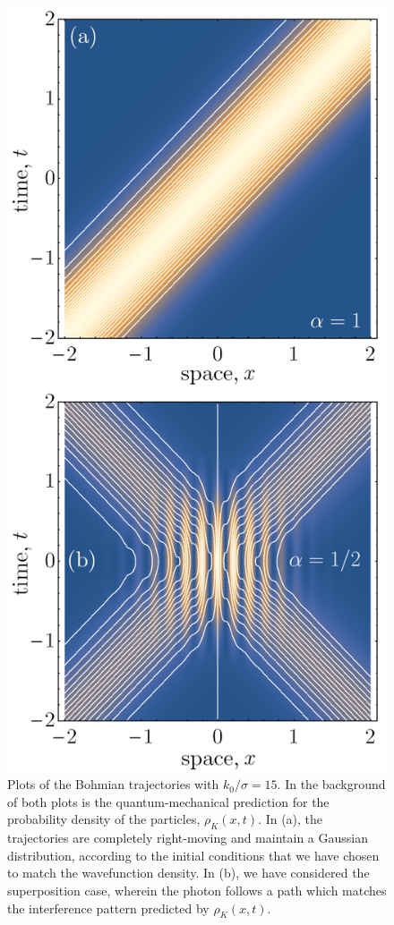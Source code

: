 \documentclass[
prx
,twocolumn
,nofootinbib
,floatfix
,superscriptaddress
]{revtex4-2}
\begin{document}
\begin{figure}[h]
    \centering
    \includegraphics[width=0.8\linewidth]{Fig2trajectoriessimplified.png}
    \caption{Plots of the Bohmian trajectories with $k_0/\sigma = 15$. In the background of both plots is the quantum-mechanical prediction for the probability density of the particles, $\rho_{K}(x,t)$. In (a), the trajectories are completely right-moving and maintain a Gaussian distribution, according to the initial conditions that we have chosen to match the wavefunction density. In (b), we have considered the superposition case, wherein the photon follows a path which matches the interference pattern predicted by $\rho_K(x,t)$. }
    \label{fig:trajectories1}
\end{figure}
\end{document}
